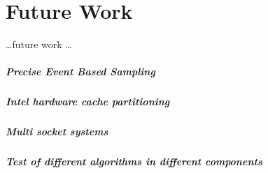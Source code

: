 \chapter{Future Work}
\label{sec:futurework}

\ldots future work \ldots


\paragraph{Precise Event Based Sampling}
\paragraph{Intel hardware cache partitioning}
\paragraph{Multi socket systems}
\paragraph{Test of different algorithms in different components}

\cleardoublepage

